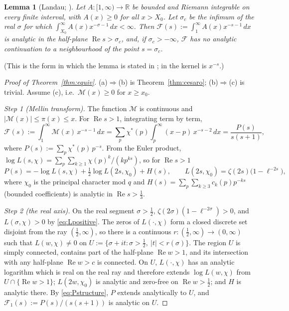 \documentclass[11pt]{amsart}
\newtheorem{lemma}[theorem]{Lemma}
\theoremstyle{definition}
\numberwithin{equation}{section}
\newcommand{\re}{\operatorname{Re}}
\newcommand{\cM}{\mathcal M}          %
\begin{document}
\begin{lemma}[Landau; {\cite[Lemma~15.1]{MV07}}]\label{lem:landau}
Let $A:[1,\infty)\to\mathbb R$ be bounded and Riemann integrable on
every finite interval, with $A(x)\ge0$ for all $x>X_0$. Let
$\sigma_c$ be the infimum of the real $\sigma$ for which
$\int_{X_0}^\infty A(x)x^{-\sigma-1}\,dx<\infty$. Then
$\mathcal F(s):=\int_1^\infty A(x)x^{-s-1}\,dx$ is analytic in the
half-plane $\re s>\sigma_c$, and, if $\sigma_c>-\infty$,
$\mathcal F$ has no analytic continuation to a neighbourhood of the
point $s=\sigma_c$.
\end{lemma}

(This is the form in which the lemma is stated in
\cite[the lemma quoting Landau's theorem]{MC}; in \cite{MV07} the kernel is $x^{-s}$.)

\begin{proof}[Proof of Theorem~\ref{thm:equiv}]
(a)$\Rightarrow$(b) is Theorem~\ref{thm:cesaro}; (b)$\Rightarrow$(c)
is trivial. Assume (c), i.e.\ $\cM(x)\ge0$ for $x\ge x_0$.

\emph{Step 1 (Mellin transform).} The function $\cM$ is continuous
and $|\cM(x)|\le\pi(x)\le x$. For $\re s>1$, integrating term by
term,
\[
\mathcal F(s):=\int_1^\infty\cM(x)\,x^{-s-1}\,dx
=\sum_p\chi^*(p)\int_p^\infty(x-p)\,x^{-s-2}\,dx
=\frac{P(s)}{s(s+1)},
\]
where $P(s):=\sum_p\chi^*(p)\,p^{-s}$.
From the Euler product,
$\log L(s,\chi)=\sum_p\sum_{k\ge1}\chi(p)^k/(kp^{ks})$, so for
$\re s>1$
\begin{equation}\label{eq:Pstructure}
P(s)=-\log L(s,\chi)+\tfrac12\log L(2s,\chi_0)+H(s),
\qquad
L(2s,\chi_0)=\zeta(2s)\bigl(1-\ell^{-2s}\bigr),
\end{equation}
where $\chi_0$ is the principal character mod $q$ and
$H(s)=\sum_p\sum_{k\ge3}c_k(p)p^{-ks}$ (bounded coefficients) is
analytic in $\re s>\tfrac13$.

\emph{Step 2 (the real axis).} On the real segment $\sigma>\tfrac12$,
$\zeta(2\sigma)(1-\ell^{-2\sigma})>0$, and $L(\sigma,\chi)>0$ by
\eqref{eq:Lpositive}. The zeros of $L(\cdot,\chi)$ form a closed
discrete set disjoint from the ray $(\tfrac12,\infty)$, so there is a
continuous $r:(\tfrac12,\infty)\to(0,\infty)$ such that
$L(w,\chi)\ne0$ on
$U:=\{\sigma+it:\sigma>\tfrac12,\ |t|<r(\sigma)\}$. The region $U$ is
simply connected, contains part of the half-plane $\re w>1$, and its
intersection with any half-plane $\re w>c$ is connected. On $U$,
$L(\cdot,\chi)$ has an analytic logarithm which is real on the real
ray and therefore extends $\log L(w,\chi)$ from $U\cap\{\re w>1\}$;
$L(2w,\chi_0)$ is analytic and zero-free on $\re w>\tfrac12$; and
$H$ is analytic there. By \eqref{eq:Pstructure}, $P$ extends
analytically to $U$, and $\mathcal F_1(s):=P(s)/(s(s+1))$ is analytic
on $U$.


\end{proof}
\end{document}
